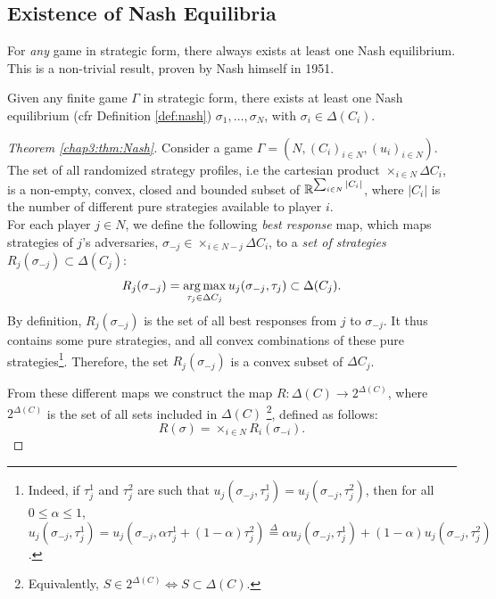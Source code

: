 \subsection{Existence of Nash Equilibria}


For \emph{any} game in strategic form, there always exists at least one Nash equilibrium.
This is a non-trivial result, proven by Nash himself in 1951. 

\begin{theorem}
Given any finite game $\Gamma$ in strategic form, there exists at least one Nash equilibrium (cfr Definition \ref{def:nash}) $\sigma_1, \ldots, \sigma_N$, with $\sigma_i \in \Delta(C_i)$.
\label{chap3:thm:Nash}
\end{theorem} 



\begin{proof}[Theorem \ref{chap3:thm:Nash}]
Consider a game $\Gamma = (N, (C_i)_{i \in N}, (u_i)_{i \in N}). $\\
The set of all randomized strategy profiles, i.e the cartesian product $\times_{i \in N} \Delta C_i$, is a non-empty, convex, closed and bounded subset of $\mathbb{R}^{\sum_{i \in N} |C_i|}$, where $|C_i|$ is the number of different pure strategies available to player $i$. \\
For each player $j \in N$, we define the following \emph{best response} map, which maps strategies of $j$'s adversaries, $\sigma_{-j} \in \times_{i \in N - j} \Delta C_i$, to a \emph{set of strategies} $R_j(\sigma_{-j}) \subset \Delta (C_j)$:
$$R_j(\sigma_{-j}) = \operatorname*{arg\,max}_{\tau_j \in \Delta C_j} u_j(\sigma_{-j}, \tau_j) \subset{\Delta(C_{j})}. $$
By definition, $R_j(\sigma_{-j})$ is the set of all best responses from $j$ to $\sigma_{-j}$. 
It thus contains some pure strategies, and all convex combinations of these pure strategies\footnote{ Indeed, if $\tau_j^1$ and $\tau_{j}^2$ are such that $u_j(\sigma_{-j}, \tau_j^1) = u_{j}(\sigma_{-j}, \tau_j^2)$, then for all $0 \leq \alpha \leq 1$, $u_j(\sigma_{-j}, \tau_j^1) = u_{j}(\sigma_{-j}, \alpha \tau_j^1 + (1-\alpha) \tau_j^2) \overset{\Delta}{=} \alpha u_j(\sigma_{-j}, \tau_j^1)+ (1-\alpha) u_{j}(\sigma_{-j}, \tau_j^2)$.}.
Therefore, the set $R_j(\sigma_{-j})$ is a convex subset of $\Delta C_j$.

From these different maps we construct the map $R : \Delta(C) \rightarrow 2^{\Delta(C)}$, where $2^{\Delta(C)}$ is the set of all sets included in ${\Delta(C)}$ \footnote{Equivalently,
$S \in 2^{\Delta(C)} \Leftrightarrow S \subset \Delta(C).$}, defined as follows:
$$R(\sigma) = \times_{i \in N}R_{i}(\sigma_{-i}). $$


\end{proof}
